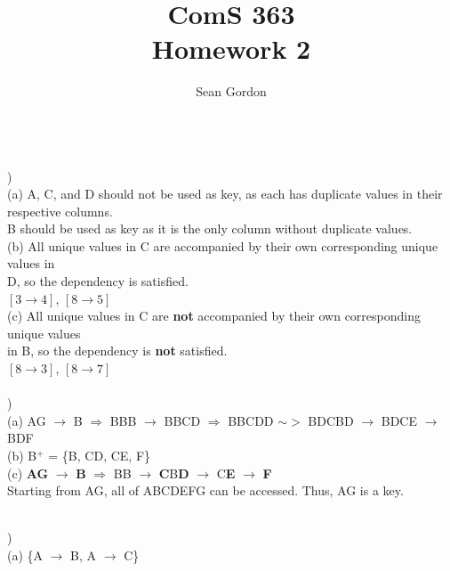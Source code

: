 \documentclass[12pt]{article}
\title{ComS 363\\Homework 2}
\author{Sean Gordon}
\begin{document}
\maketitle


\hrulefill \\



)\\
\indent \indent (a) A, C, and D should not be used as key, as each has duplicate values in their\\ 
\indent \indent respective columns.\\
\indent \indent B should be used as key as it is the only column without duplicate values.\\

\indent (b) All unique values in C are accompanied by their own corresponding unique values in \\
\indent \indent D, so the dependency is satisfied.\\
\indent \indent $[3 \rightarrow 4]$, $[8 \rightarrow 5]$\\

\indent (c) All unique values in C are \textbf{not} accompanied by their own corresponding unique values\\
\indent \indent in B, so the dependency is \textbf{not} satisfied.\\
\indent \indent $[8 \rightarrow 3]$, $[8 \rightarrow 7]$\\


\hrulefill\\


)\\
\indent \indent (a) AG $\rightarrow$ B $\Rightarrow$ BBB $\rightarrow$ BBCD $\Rightarrow$ BBCDD $\sim>$ BDCBD $\rightarrow$ BDCE $\rightarrow$ BDF\\

\indent \indent (b) B$^+$ = \{B, CD, CE, F\}\\

\indent \indent (c) \textbf{AG} $\rightarrow$ \textbf{B} $\Rightarrow$ BB $\rightarrow$ \textbf{C}B\textbf{D} $\rightarrow$  C\textbf{E} $\rightarrow$ \textbf{F}\\
\indent \indent Starting from AG, all of ABCDEFG can be accessed. Thus, AG is a key.\\


\hrulefill\\
\pagebreak


) \\
\indent \indent (a) \{A $\rightarrow$ B, A $\rightarrow$ C\}\\
\end{document}
